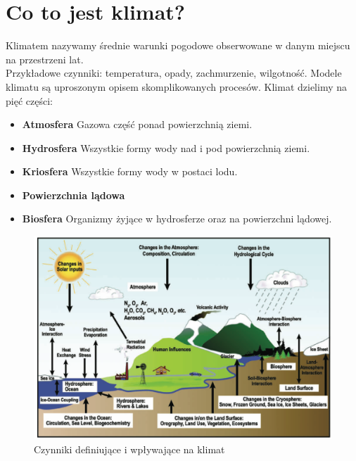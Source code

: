 \documentclass{article}
\theoremstyle{plain}
\begin{document}
\section{Co to jest klimat?}
Klimatem nazywamy średnie warunki pogodowe obserwowane w danym miejscu na przestrzeni lat. \\
Przykładowe czynniki: temperatura, opady, zachmurzenie, wilgotność.
Modele klimatu są uproszonym opisem skomplikowanych procesów.
Klimat dzielimy na pięć części:
\begin{itemize}
	\item \textbf{Atmosfera} Gazowa część ponad powierzchnią ziemi.
	\item \textbf{Hydrosfera} Wszystkie formy wody nad i pod powierzchnią ziemi. 
	\item \textbf{Kriosfera} Wszystkie formy wody w postaci lodu.
	\item \textbf{Powierzchnia lądowa}
	\item \textbf{Biosfera} Organizmy żyjące w hydrosferze oraz na powierzchni lądowej.
\end{itemize}
\begin{figure}[h]
\begin{center}
\includegraphics[width=0.7\linewidth]{images/Figure1}
\caption{Czynniki definiujące i wpływające na klimat}
\end{center}

\end{figure}
\end{document}
